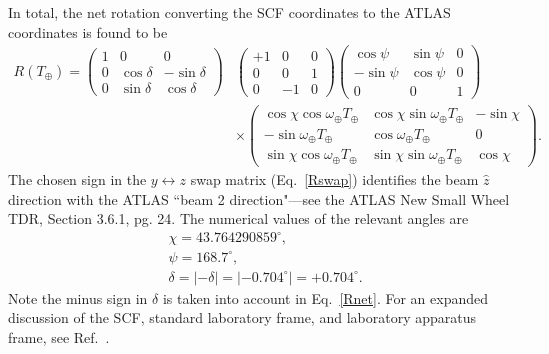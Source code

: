 In total, the net rotation converting 
the SCF coordinates to the ATLAS coordinates is found to be
%
\begin{align}
\label{Rnet}
R(T_\oplus) = \begin{pmatrix} 1 & 0 & 0
\\ 0 & \cos\delta & -\sin\delta \\ 0 & \sin\delta & \cos\delta
\end{pmatrix}&\begin{pmatrix} + 1 & 0 & 0
\\ 0 & 0 & 1 \\ 0 & - 1 & 0 
\end{pmatrix}
\begin{pmatrix} \cos\psi & \sin\psi & 0 \\ 
-\sin\psi& \cos\psi& 0 \\ 0 & 0 & 1 \end{pmatrix} \nonumber \\
&\times\begin{pmatrix} 
\cos\chi\cos\omega_\oplus T_\oplus & \cos\chi\sin\omega_\oplus T_\oplus 
& -\sin\chi \\ -\sin\omega_\oplus T_\oplus & \cos\omega_\oplus T_\oplus & 0
\\ \sin\chi\cos\omega_\oplus T_\oplus & \sin\chi \sin\omega_\oplus T_\oplus & \cos\chi
\end{pmatrix}.
\end{align}
%
The chosen sign in the $y\leftrightarrow z$ swap
matrix (Eq.~\eqref{Rswap}) identifies the 
beam $\widehat{z}$ direction with the ATLAS
``beam 2 direction"---see the ATLAS New Small Wheel TDR, Section 3.6.1, pg. 24.
The numerical values of the relevant angles are
%
\begin{align}
\label{angularvalues}
&\chi = 43.764290859^\circ, \\
&\psi = 168.7^\circ, \\
&\delta = |-\delta| = |-0.704^\circ| = + 0.704^\circ.
\end{align}
%
Note the minus sign in $\delta$ is taken into account in Eq.~\eqref{Rnet}.
For an expanded discussion of the SCF, standard
laboratory frame, and laboratory apparatus frame, see
Ref.~\cite{km09}.
%
%
